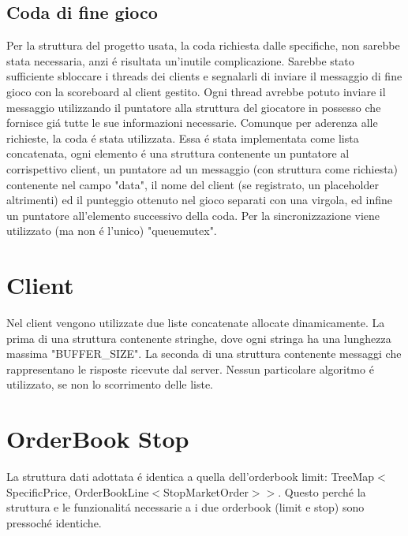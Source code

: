 \subsection{Coda di fine gioco}

Per la struttura del progetto usata, la coda richiesta dalle specifiche, non sarebbe stata necessaria, anzi \'e risultata un'inutile complicazione. Sarebbe stato sufficiente sbloccare i threads dei clients e segnalarli di inviare il messaggio di fine gioco con la scoreboard al client gestito. Ogni thread avrebbe potuto inviare il messaggio utilizzando il puntatore alla struttura del giocatore in possesso che fornisce gi\'a tutte le sue informazioni necessarie. Comunque per aderenza alle richieste, la coda \'e stata utilizzata. Essa \'e stata implementata come lista concatenata, ogni elemento \'e una struttura contenente un puntatore al corrispettivo client, un puntatore ad un messaggio (con struttura come richiesta) contenente nel campo "data", il nome del client (se registrato, un placeholder altrimenti) ed il punteggio ottenuto nel gioco separati con una virgola, ed infine un puntatore all'elemento successivo della coda. Per la sincronizzazione viene utilizzato (ma non \'e l'unico) "queuemutex".
	
\section{Client}

Nel client vengono utilizzate due liste concatenate allocate dinamicamente. La prima di una struttura contenente stringhe, dove ogni stringa ha una lunghezza massima "BUFFER\_SIZE". La seconda di una struttura contenente messaggi che rappresentano le risposte ricevute dal server. Nessun particolare algoritmo \'e utilizzato, se non lo scorrimento delle liste.

\section{OrderBook Stop}
La struttura dati adottata \'e identica a quella dell'orderbook limit: TreeMap\(<\)SpecificPrice, OrderBookLine\(<\)StopMarketOrder\(>>\). Questo perch\'e la struttura e le funzionalit\'a necessarie a i due orderbook (limit e stop) sono pressoch\'e identiche.


